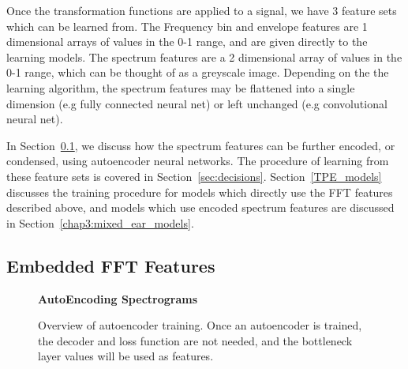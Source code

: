 \documentclass[\main/thesis.tex]{subfiles}
\begin{document}
Once the transformation functions are applied to a signal, we have 3 feature sets which can be learned from. The Frequency bin and envelope features are 1 dimensional arrays of values in the 0-1 range, and are given directly to the learning models. The spectrum features are a 2 dimensional array of values in the 0-1 range, which can be thought of as a greyscale image. Depending on the the learning algorithm, the spectrum features may be flattened into a single dimension (e.g fully connected neural net) or left unchanged (e.g convolutional neural net). 

In Section~\ref{section:embedded_feats}, we discuss how the spectrum features can be further encoded, or condensed, using autoencoder neural networks. The procedure of learning from these feature sets is covered in Section~\ref{sec:decisions}. Section~\ref{TPE_models} discusses the training procedure for models which directly use the FFT features described above, and models which use encoded spectrum features are discussed in Section~\ref{chap3:mixed_ear_models}.

\subsection{Embedded FFT Features}
\label{section:embedded_feats}
\begin{figure}[t!]
    \begin{center}
    \textbf{AutoEncoding Spectrograms}
    \end{center}
    \caption{Overview of autoencoder training. Once an autoencoder is trained, the decoder and loss function are not needed, and the bottleneck layer values will be used as features. }
\label{fig:autoencoder}
\end{figure}
\end{document}
